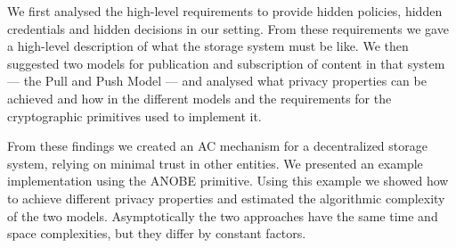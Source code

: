 

We first analysed the high-level requirements to provide hidden policies, 
hidden credentials and hidden decisions in our setting.
From these requirements we gave a high-level description of what the storage 
system must be like.
We then suggested two models for publication and subscription of content in 
that system --- the Pull and Push Model --- and analysed what privacy 
properties can be achieved and how in the different models and the requirements 
for the cryptographic primitives used to implement it.

From these findings we created an \ac{AC} mechanism for a decentralized storage 
system, relying on minimal trust in other entities.
We presented an example implementation using the \ac{ANOBE} primitive.
Using this example we showed how to achieve different privacy properties and 
estimated the algorithmic complexity of the two models.
Asymptotically the two approaches have the same time and space complexities, 
but they differ by constant factors.


